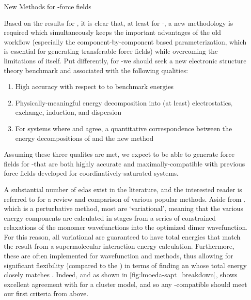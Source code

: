 \begin{section}{New Methods for \cus-\mof force fields}
\label{sec:lmoeda-theory}

Based on the results for \mgmof, it is clear that, at least for \cus-\mofs, a
new methodology is required which simultaneously keeps the important advantages of the
old workflow (especially the component-by-component based parameterization,
which is essential for generating transferable force fields) while overcoming
the limitations of \sapt itself. Put differently, for \cus-\mofs we should
seek a new electronic structure theory benchmark and associated \eda 
with the following qualities:
%
\begin{enumerate}
\item High accuracy with respect to to \ccsdtf benchmark energies
\item Physically-meaningful energy decomposition into (at least)
electrostatics, exchange, induction, and dispersion
\item For systems where \sapt and \ccsdtf agree, a quantitative correspondence
between the energy decompositions of \sapt and the new method
\end{enumerate}
%
Assuming these three qualites are met, we expect to be able to generate force
fields for \cus-\mofs that are both highly accurate and maximally-compatible
with previous force fields developed for coordinatively-saturated \mof
systems. 

A substantial number of \glspl{eda} exist in the literature,
and the interested reader is referred to  for a
review and comparison of various popular methods. Aside from \sapt, which is a
perturbative method, most \edas are `variational', meaning that the
various energy components are calculated in stages from a series of constrained
relaxations of the monomer wavefunctions into the optimized
dimer wavefunction. For this reason, all variational \edas
are guaranteed to have total energies that match the result from a supermolecular
interaction energy calculation. Furthermore, these \edas are often implemented
for wavefunction and \dft methods, thus allowing for significant
flexibility (compared to the \sapt \eda) in terms of finding an \eda whose
total energy closely matches \ccsdtf. Indeed, and 
as shown in
\cref{fig:lmoeda-sapt_breakdown}, \pbeod
shows excellent agreement with \ccsdtf for a \mgmof cluster model, 
and so any \dft-compatible \eda should meet our first criteria from above.


\end{section}
